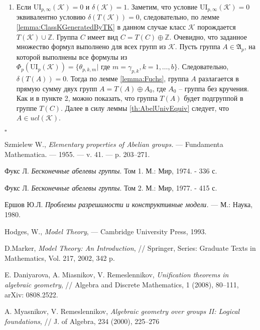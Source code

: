 \documentclass[a4paper,11pt,twoside]{article}
\def\A{{\mathfrak{A}}}
\def\K{{\mathcal{K}}}
\def\Z{{\mathbb{Z}}}
\def\ui{{\mathrm{UI}}}
\begin{document}
\begin{enumerate}
\item Если $\ui_{p, \infty}(\K) = 0$ и $\delta(\K) = 1$. Заметим, что условие $\ui_{p, \infty}(\K) = 0$ эквивалентно условию $\delta(T(\K)) = 0$, следовательно, по лемме \ref{lemma:ClassKGeneratedByTK} в данном случае класс $\K$ порождается $T(\K) \cup \Z$. Группа $C$ имеет вид $C = T(C) \oplus \Z$. Очевидно, что заданное множество формул выполнено для всех групп из $\K$. Пусть группа $A \in \A_p$, на которой выполнены все формулы из $\Phi_p(\ui_p(\K)) = \{\theta_{p,k,m} | \text{ где } m = \gamma_{p,k}, k = 1, \ldots, b\}.$ Следовательно, $\delta(T(A)) = 0$. Тогда по лемме \ref{lemma:Fuchs}, группа $A$ разлагается в прямую сумму двух групп $A = T(A) \oplus A_0$, где $A_0$ -- группа без кручения. Как и в пункте 2, можно показать, что группа $T(A)$ будет подгруппой в группе $T(C)$. Далее в силу леммы \ref{th:AbelUnivEquiv} следует, что $A \in ucl(\K)$.
\end{enumerate} 
$\square$



\begin{thebibliography}{}

 Szmielew W., \textit{Elementary properties of Abelian groups.} — Fundamenta Mathematica. —
1955. — v. 41. — p. 203–271.

 Фукс Л. \textit{Бесконечные абелевы группы}. Том 1. М.: Мир, 1974. - 336 с.

 Фукс Л. \textit{Бесконечные абелевы группы}. Том 2. М.: Мир, 1977. - 415 с.

 Ершов Ю.Л. \textit{Проблемы разрешимости и конструктивные модели.} --- М.: Наука, 1980.

 Hodges, W., \textit{Model Theory}, --- Cambridge University Press, 1993. 

 D.Marker, \textit{Model Theory: An Introduction}, // Springer, Series: Graduate Texts in Mathematics, Vol. 217, 2002, 342 p.

 E. Daniyarova, A. Miasnikov, V. Remeslennikov, \textit{Unification theorems in algebraic geometry}, // Algebra and Discrete Mathematics, 1 (2008), 80--111, arXiv: 0808.2522.

 A. Myasnikov, V. Remeslennikov, \textit{Algebraic geometry over groups II: Logical foundations}, // J. of Algebra, 234 (2000), 225--276

\end{thebibliography}
\end{document}
